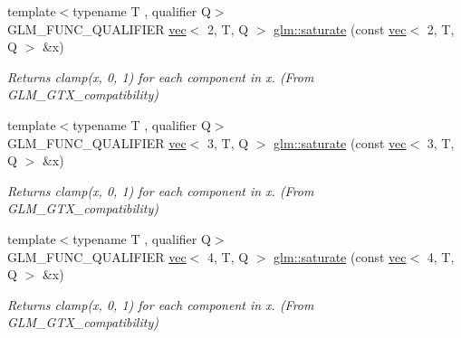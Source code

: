 \begin{DoxyCompactItemize}
\mbox{\label{group__gtx__compatibility_gaee97b8001c794a78a44f5d59f62a8aba}} 
{\footnotesize template$<$typename T , qualifier Q$>$ }\\G\+L\+M\+\_\+\+F\+U\+N\+C\+\_\+\+Q\+U\+A\+L\+I\+F\+I\+ER \hyperlink{structglm_1_1vec}{vec}$<$ 2, T, Q $>$ \hyperlink{group__gtx__compatibility_gaee97b8001c794a78a44f5d59f62a8aba}{glm\+::saturate} (const \hyperlink{structglm_1_1vec}{vec}$<$ 2, T, Q $>$ \&x)
\begin{DoxyCompactList}\small\item\em Returns clamp(x, 0, 1) for each component in x. (From G\+L\+M\+\_\+\+G\+T\+X\+\_\+compatibility) \end{DoxyCompactList}\item 
\mbox{\label{group__gtx__compatibility_ga39bfe3a421286ee31680d45c31ccc161}} 
{\footnotesize template$<$typename T , qualifier Q$>$ }\\G\+L\+M\+\_\+\+F\+U\+N\+C\+\_\+\+Q\+U\+A\+L\+I\+F\+I\+ER \hyperlink{structglm_1_1vec}{vec}$<$ 3, T, Q $>$ \hyperlink{group__gtx__compatibility_ga39bfe3a421286ee31680d45c31ccc161}{glm\+::saturate} (const \hyperlink{structglm_1_1vec}{vec}$<$ 3, T, Q $>$ \&x)
\begin{DoxyCompactList}\small\item\em Returns clamp(x, 0, 1) for each component in x. (From G\+L\+M\+\_\+\+G\+T\+X\+\_\+compatibility) \end{DoxyCompactList}\item 
\mbox{\label{group__gtx__compatibility_ga356f8c3a7e7d6376d3d4b0a026407183}} 
{\footnotesize template$<$typename T , qualifier Q$>$ }\\G\+L\+M\+\_\+\+F\+U\+N\+C\+\_\+\+Q\+U\+A\+L\+I\+F\+I\+ER \hyperlink{structglm_1_1vec}{vec}$<$ 4, T, Q $>$ \hyperlink{group__gtx__compatibility_ga356f8c3a7e7d6376d3d4b0a026407183}{glm\+::saturate} (const \hyperlink{structglm_1_1vec}{vec}$<$ 4, T, Q $>$ \&x)
\begin{DoxyCompactList}\small\item\em Returns clamp(x, 0, 1) for each component in x. (From G\+L\+M\+\_\+\+G\+T\+X\+\_\+compatibility) \end{DoxyCompactList}\item 
\mbox{\label{group__gtx__compatibility_gac63011205bf6d0be82589dc56dd26708}} 

\end{DoxyCompactItemize}
